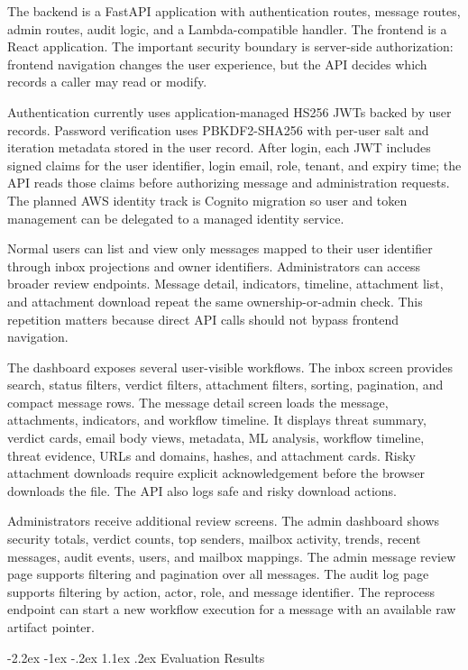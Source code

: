 \documentclass[12pt,a4paper]{article}
\makeatletter
\renewcommand\section{\@startsection {section}{1}{\z@}%
  {-2.2ex \@plus -1ex \@minus -.2ex}%
  {1.1ex \@plus .2ex}%
  {\centering\normalfont\normalsize\bfseries}}
\makeatother
\begin{document}
The backend is a FastAPI application with authentication routes, message routes, admin routes, audit logic, and a Lambda-compatible handler. The frontend is a React application. The important security boundary is server-side authorization: frontend navigation changes the user experience, but the API decides which records a caller may read or modify.

Authentication currently uses application-managed HS256 JWTs backed by user records. Password verification uses PBKDF2-SHA256 with per-user salt and iteration metadata stored in the user record. After login, each JWT includes signed claims for the user identifier, login email, role, tenant, and expiry time; the API reads those claims before authorizing message and administration requests. The planned AWS identity track is Cognito migration so user and token management can be delegated to a managed identity service.

Normal users can list and view only messages mapped to their user identifier through inbox projections and owner identifiers. Administrators can access broader review endpoints. Message detail, indicators, timeline, attachment list, and attachment download repeat the same ownership-or-admin check. This repetition matters because direct API calls should not bypass frontend navigation.

The dashboard exposes several user-visible workflows. The inbox screen provides search, status filters, verdict filters, attachment filters, sorting, pagination, and compact message rows. The message detail screen loads the message, attachments, indicators, and workflow timeline. It displays threat summary, verdict cards, email body views, metadata, ML analysis, workflow timeline, threat evidence, URLs and domains, hashes, and attachment cards. Risky attachment downloads require explicit acknowledgement before the browser downloads the file. The API also logs safe and risky download actions.

Administrators receive additional review screens. The admin dashboard shows security totals, verdict counts, top senders, mailbox activity, trends, recent messages, audit events, users, and mailbox mappings. The admin message review page supports filtering and pagination over all messages. The audit log page supports filtering by action, actor, role, and message identifier. The reprocess endpoint can start a new workflow execution for a message with an available raw artifact pointer.

\section{Evaluation Results}
\end{document}
